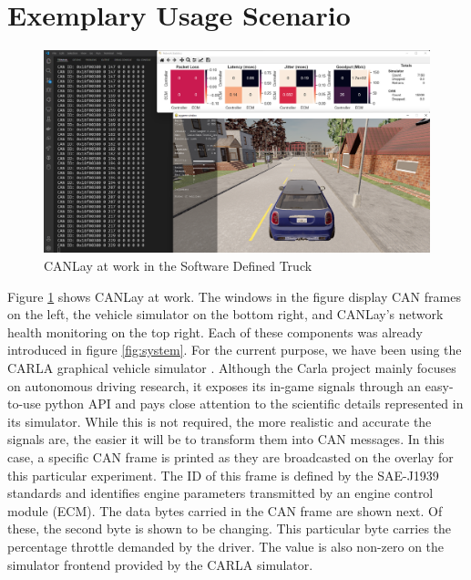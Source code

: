 \documentclass[letterpaper,twocolumn,12pt]{article}
\begin{document}
\section{Exemplary Usage Scenario}\label{sec:usage}
\begin{figure}[]
    \centering
    \includegraphics[width=\linewidth]{images/usability.png}
    \caption{CANLay at work in the Software Defined Truck}
    \label{fig:usabiity}
\end{figure}
Figure \ref{fig:usabiity} shows CANLay at work. The windows in the figure display CAN frames on the left, the vehicle simulator on the bottom right, and CANLay's network health monitoring on the top right. Each of these components was already introduced in figure \ref{fig:system}. For the current purpose, we have been using the CARLA graphical vehicle simulator \cite{Dosovitskiy17}. 
Although the Carla project mainly focuses on autonomous driving research, it exposes its in-game signals through an easy-to-use python API and pays close attention to the scientific details represented in its simulator. While this is not required, the more realistic and accurate the signals are, the easier it will be to transform them into CAN messages. In this case, a specific CAN frame is printed as they are broadcasted on the overlay for this particular experiment. The ID of this frame is defined by the SAE-J1939 standards \cite{society_of_automotive_engineers_sae_nodate} and identifies engine parameters transmitted by an engine control module (ECM). The data bytes carried in the CAN frame are shown next. Of these, the second byte is shown to be changing. This particular byte carries the percentage throttle demanded by the driver. The value is also non-zero on the simulator frontend provided by the CARLA simulator.
\end{document}
